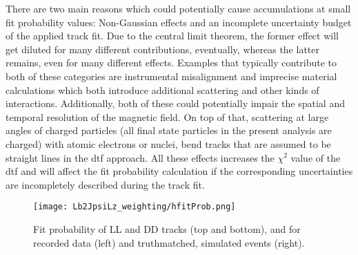There are two main reasons which could potentially cause accumulations at small fit probability values: Non-Gaussian effects and an incomplete uncertainty budget of the applied track fit.
Due to the central limit theorem, the former effect will get diluted for many different contributions, eventually, whereas the latter remains, even for many different effects.
Examples that typically contribute to both of these categories are instrumental misalignment and imprecise material calculations which both introduce additional scattering and other kinds of interactions.
Additionally, both of these could potentially impair the spatial and temporal resolution of the magnetic field.
On top of that, scattering at large angles of charged particles (all final state particles in the present analysis are charged) with atomic electrons or nuclei, bend tracks that are assumed to be straight lines in the \gls{dtf} approach.
All these effects increases the $\chi^2$ value of the \gls{dtf} and will affect the fit probability calculation if the corresponding uncertainties are incompletely described during the track fit.

\begin{figure}[htbp]
    \centering
    \texttt{[image: Lb2JpsiLz\_weighting/hfitProb.png]}
    \caption{Fit probability of \gls{LL} and \gls{DD} tracks (top and bottom), and for recorded data (left) and \gls{truthmatched}, simulated events (right).}
    \label{fig:fitprob_LbToJpsiLz}
\end{figure}

